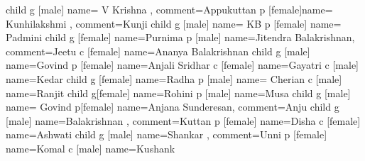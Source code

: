 \documentclass{article}
\begin{document}
\begin{landscape}
\begin{genealogypicture}
{{{{			}
		}
		child {
			g [male] {name={ V Krishna }, comment={Appukuttan}}
			p [female]{name={ Kunhilakshmi }, comment={Kunji}}
			child {
				g [male] {name={ KB }}
				p [female] {name={ Padmini }}
				child {
					g [female] {name={Purnima }}
					p [male] {name={Jitendra Balakrishnan}, comment={Jeetu}}
					c [female] {name={Ananya Balakrishnan}}
				}
				child {
					g [male] {name={Govind }}
					p [female] {name={Anjali Sridhar}}
					c [female] {name={Gayatri }}
					c [male] {name={Kedar }}
				}
			}
			child {
				g [female] {name={Radha }}
				p [male] {name={ Cherian }}
				c [male] {name={Ranjit }}
				child {
					g[female] {name={Rohini }}
					p [male] {name=Musa}
				}
			}
			child {
				g [male] {name={ Govind }}
				p[female] {name={Anjana Sunderesan}, comment={Anju}}
				child {
					g [male] {name={Balakrishnan }, comment={Kuttan}}
					p [female] {name={Disha }}
					c [female] {name={Ashwati }}
				}
				child {
					g [male] {name={Shankar }, comment={Unni}}
					p [female] {name={Komal }}
					c [male] {name={Kushank }}
				}
			}
		}
	}
}

\end{genealogypicture}

\end{landscape}
\end{document}
